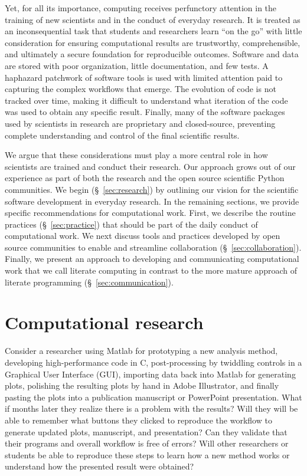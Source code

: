 \documentclass[ChapterTOCs,krantz2]{krantz} %
\begin{document}
Yet, for all its importance, computing receives perfunctory attention in the
training of new scientists and in the conduct of everyday research.  It is
treated as an inconsequential task that students and researchers learn ``on the
go'' with little consideration for ensuring computational results are
trustworthy, comprehensible, and ultimately a secure foundation for
reproducible outcomes.  Software and data are stored with poor organization,
little documentation, and few tests.  A haphazard patchwork of software tools
is used with limited attention paid to capturing the complex workflows that
emerge.  The evolution of code is not tracked over time, making it difficult to
understand what iteration of the code was used to obtain any specific result.
Finally, many of the software packages used by scientists in research are
proprietary and closed-source, preventing complete understanding and control of
the final scientific results.

We argue that these considerations must play a more central role in how
scientists are trained and conduct their research. Our approach grows out of
our experience as part of both the research and the open source scientific
Python communities.  We begin (§~\ref{sec:research}) by outlining our vision
for the scientific software development in everyday research. In the remaining
sections, we provide specific recommendations for computational work.  First,
we describe the routine practices (§~\ref{sec:practice}) that should be part of
the daily conduct of computational work. We next discuss tools and practices
developed by open source communities to enable and streamline collaboration
(§~\ref{sec:collaboration}). Finally, we present an approach to developing and
communicating computational work that we call literate computing in contrast to
the more mature approach of literate programming (§~\ref{sec:communication}).

\section{\label{sec:research}Computational research}

Consider a researcher using Matlab for prototyping a new analysis method,
developing high-performance code in C, post-processing by twiddling controls in
a Graphical User Interface (GUI), importing data back into Matlab for
generating plots, polishing the resulting plots by hand in Adobe Illustrator,
and finally pasting the plots into a publication manuscript or PowerPoint
presentation. What if months later they realize there is a problem with the
results? Will they will be able to remember what buttons they clicked to
reproduce the workflow to generate updated plots, manuscript, and presentation?
Can they validate that their programs and overall workflow is free of errors?
Will other researchers or students be able to reproduce these steps to learn
how a new method works or understand how the presented result were obtained?
\end{document}
